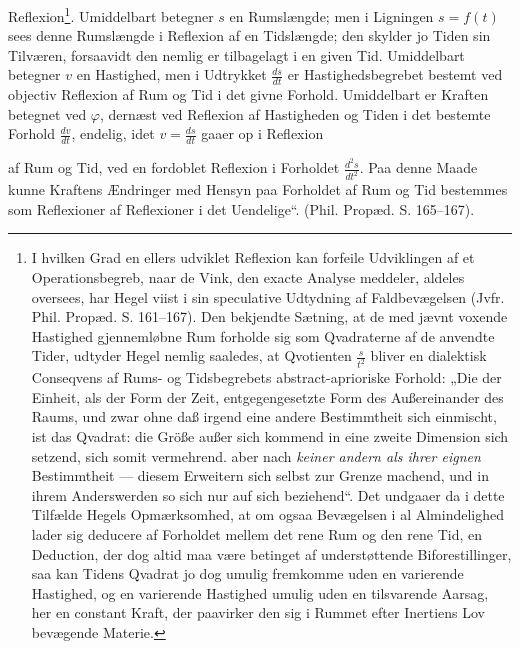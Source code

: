 \documentclass[12pt,a4paper]{book}
\begin{document}
Reflexion\footnote{I hvilken Grad en ellers udviklet Reflexion kan
forfeile Udviklingen af et Operationsbegreb, naar de Vink, den exacte
Analyse meddeler, aldeles oversees, har Hegel viist i sin speculative
Udtydning af Faldbevægelsen (Jvfr. Phil. Propæd. S. 161--167). Den
bekjendte Sætning, at de med jævnt voxende Hastighed gjennemløbne Rum
forholde sig som Qvadraterne af de anvendte Tider, udtyder Hegel
nemlig saaledes, at Qvotienten $\frac{s}{t^{2}}$ bliver en dialektisk
Conseqvens af Rums- og Tidsbegrebets abstract-aprioriske Forhold: „Die
der Einheit, als der Form der Zeit, entgegengesetzte Form des
Außereinander des Raums, und zwar ohne daß irgend eine andere
Bestimmtheit sich einmischt, ist das Qvadrat: die Größe außer sich
kommend in eine zweite Dimension sich setzend, sich somit vermehrend.
aber nach \emph{keiner andern als ihrer eignen} Bestimmtheit ---
diesem Erweitern sich selbst zur Grenze machend, und in ihrem
Anderswerden so sich nur auf sich beziehend“. Det undgaaer da i dette
Tilfælde Hegels Opmærksomhed, at om ogsaa Bevægelsen i al
Almindelighed lader sig deducere af Forholdet mellem det rene Rum og
den rene Tid, en Deduction, der dog altid maa være betinget af
understøttende Biforestillinger, saa kan Tidens Qvadrat jo dog umulig
fremkomme uden en varierende Hastighed, og en varierende Hastighed
umulig uden en tilsvarende Aarsag, her en constant Kraft, der
paavirker den sig i Rummet efter Inertiens Lov bevægende Materie.}.
Umiddelbart betegner $s$ en Rumslængde; men i Ligningen $s = f(t)$
sees denne Rumslængde i Reflexion af en Tidslængde; den skylder jo
Tiden sin Tilværen, forsaavidt den nemlig er tilbagelagt i en given
Tid. Umiddelbart betegner $v$ en Hastighed, men i Udtrykket
$\frac{ds}{dt}$ er Hastighedsbegrebet bestemt ved objectiv Reflexion
af Rum og Tid i det givne Forhold. Umiddelbart er Kraften betegnet ved
$\varphi$, dernæst ved Reflexion af Hastigheden og Tiden i det
bestemte Forhold $\frac{dv}{dt}$, endelig, idet $v = \frac{ds}{dt}$
gaaer op i Reflexion

\setcounter{footnote}{0}
af Rum og Tid, ved en fordoblet Reflexion i Forholdet
$\frac{d^2s}{dt^2}$. Paa denne Maade kunne Kraftens Ændringer med
Hensyn paa Forholdet af Rum og Tid bestemmes som Reflexioner
af Reflexioner i det Uendelige“. (Phil. Propæd. S. 165--167).
\end{document}
